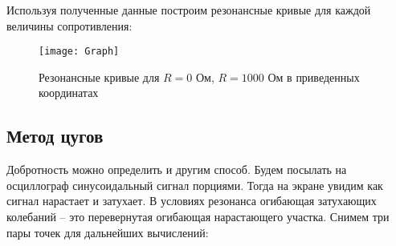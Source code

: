 \documentclass{lab}
\begin{document}
\begin{table}[H]
\centering
\renewcommand{\arraystretch}{1.3}
\renewcommand{\arraystretch}{1}
\caption{\footnotesize Полученные значения при R = 100 Ом}
\label{tab2}
\end{table}

Используя полученные данные построим резонансные кривые для каждой величины сопротивления:

\begin{figure}[H]
	\centering
	\texttt{[image: Graph]}
	\caption{\footnotesize Резонансные кривые для $R = 0$ Ом, $R = 1000$ Ом в приведенных координатах}
\end{figure}

\newpage

\subsection*{Метод цугов}

Добротность можно определить и другим способ. Будем посылать на осциллограф синусоидальный
сигнал порциями. Тогда на экране увидим как сигнал нарастает и затухает. В условиях
резонанса огибающая затухающих колебаний -- это перевернутая огибающая нарастающего участка.
Снимем три пары точек для дальнейших вычислений:
\end{document}

